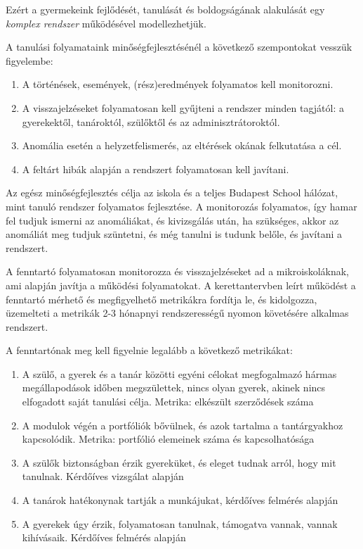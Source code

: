 Ezért a gyermekeink fejlődését, tanulását és boldogságának alakulását egy \emph{komplex rendszer} működésével modellezhetjük.

A tanulási folyamataink minőségfejlesztésénél a következő szempontokat vesszük figyelembe:
\begin{enumerate}
\item  A történések, események, (rész)eredmények folyamatos kell monitorozni.
\item  A visszajelzéseket folyamatosan kell gyűjteni a rendszer minden tagjától: a gyerekektől, tanároktól, szülőktől és az adminisztrátoroktól.
\item Anomália esetén a helyzetfelismerés, az eltérések okának felkutatása a cél.
\item A feltárt hibák alapján a rendszert folyamatosan kell javítani.
\end{enumerate}

Az egész minőségfejlesztés célja az iskola és a teljes  Budapest School hálózat, mint tanuló rendszer folyamatos fejlesztése. A monitorozás folyamatos, így hamar fel tudjuk ismerni az anomáliákat, és kivizsgálás után, ha szükséges, akkor az anomáliát meg tudjuk szüntetni, és még tanulni is tudunk belőle, és javítani a rendszert.

A fenntartó folyamatosan monitorozza és visszajelzéseket ad a mikroiskoláknak, ami alapján javítja a működési folyamatokat. A kerettantervben leírt működést a fenntartó mérhető és megfigyelhető metrikákra fordítja le, és kidolgozza, üzemelteti a metrikák 2-3 hónapnyi rendszerességű nyomon követésére alkalmas rendszert.

A fenntartónak meg kell figyelnie legalább a következő metrikákat:
\begin{enumerate}
\item A szülő, a gyerek és a tanár közötti egyéni célokat megfogalmazó hármas megállapodások időben megszülettek, nincs olyan gyerek, akinek nincs elfogadott saját tanulási célja. Metrika: elkészült szerződések száma

\item A modulok végén a portfóliók bővülnek, és azok tartalma a tantárgyakhoz kapcsolódik. Metrika: portfólió elemeinek száma és kapcsolhatósága

\item A szülők biztonságban érzik gyereküket, és eleget tudnak arról, hogy mit tanulnak. Kérdőíves vizsgálat alapján

\item A tanárok hatékonynak tartják a munkájukat, kérdőíves felmérés alapján

\item A gyerekek úgy érzik, folyamatosan tanulnak, támogatva vannak, vannak kihívásaik. Kérdőíves felmérés alapján
\end{enumerate}

